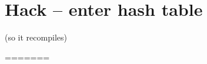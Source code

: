 \documentclass[10pt]{book}
\begin{document}
%
%
%
%
%
%
%
%
%
%


\section{Hack -- enter hash table}
(so it recompiles)

=======
\end{document}
